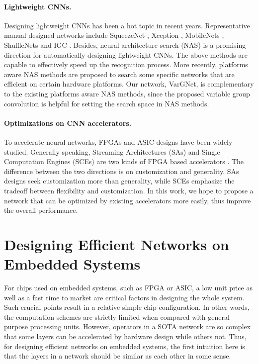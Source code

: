 \documentclass{article}
\begin{document}
\paragraph{Lightweight CNNs.}
Designing lightweight CNNs has been a hot topic in recent years. Representative manual designed networks include SqueezeNet \cite{2016_SqueezeNet}, Xception \cite{chollet2017xception}, MobileNets \cite{howard2017mobilenets, sandler2018mobilenetv2}, ShuffleNets \cite{zhang2018shufflenet, ma2018shufflenet} and IGC \cite{zhang2017interleaved, xie2018interleaved, sun2018igcv3}.
Besides, neural architecture search (NAS) \cite{zoph2016neural, pham2018efficient, Real2018Regularized, zoph2017learning, liu2018darts} is a promising direction for automatically designing lightweight CNNs. 
The above methods are capable to effectively speed up the recognition process. 
More recently, platforms aware NAS methods are proposed \cite{cai2018proxylessnas, fbnet, dai2018chamnet, stamoulis2019single} to search some specific networks that are efficient on certain hardware platforms. 
Our network, VarGNet, is complementary to the existing platforms aware NAS methods, since the proposed variable group convolution is helpful for setting the search space in NAS methods.

\paragraph{Optimizations on CNN accelerators.}
To accelerate neural networks, FPGAs \cite{FarabetPHL09, ZhangLSGXC15, gupta2015deep, ma2017optimizing} and ASIC designs \cite{chen2014diannao, reagen2016minerva, jouppi2017datacenter, luo2017dadiannao, hegde2018ucnn} have been widely studied. 
Generally speaking, Streaming Architectures (SAs) \cite{venieris2017fpgaconvnet, xiao2017exploring} and Single Computation Engines (SCEs) \cite{guo2016angel, chang2017compiling, abdelfattah2018dla} are two kinds of FPGA based accelerators \cite{venieris2018toolflows}. 
The difference between the two directions is on customization and generality. SAs designs seek customization more than generality, while SCEs emphasize the tradeoff between flexibility and customization. 
In this work, we hope to propose a network that can be optimized by existing accelerators more easily, thus improve the overall performance. 


\section{Designing Efficient Networks on Embedded Systems}
For chips used on embedded systems, such as FPGA or ASIC, a low unit price as well as a fast time to market are critical factors in designing the whole system. Such crucial points result in a relative simple chip configuration. In other words, the computation schemes are strictly limited  when compared with general-purpose processing units.
However, operators in a SOTA network are so complex that some layers can be accelerated by hardware design while others not.
Thus, for designing efficient networks on embedded systems, the first intuition here is that the layers in a network should be similar as each other in some sense. 
\end{document}
